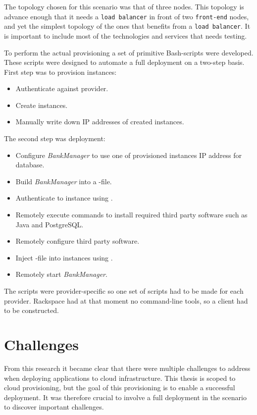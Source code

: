 The topology chosen for this scenario was that of three nodes.
This topology is advance enough that it needs a \texttt{load balancer} in front of two
\texttt{front-end} nodes, and yet the simplest topology of the ones that benefits from a \texttt{load balancer}.
It is important to include most of the technologies and services that needs testing.

To perform the actual provisioning a set of primitive Bash-scripts were developed.
These scripts were designed to automate a full deployment on a two-step basis.
First step was to provision instances:
\begin{itemize}
  \item Authenticate against provider.
  \item Create instances.
  \item Manually write down IP addresses of created instances.
\end{itemize}
The second step was deployment:
\begin{itemize}
  \item Configure \emph{BankManager} to use one of provisioned instances IP address for database.
  \item Build \emph{BankManager} into a -file.
  \item Authenticate to instance using .
  \item Remotely execute commands to install required third party software such as Java and PostgreSQL.
  \item Remotely configure third party software.
  \item Inject -file into instances using .
  \item Remotely start \emph{BankManager}.
\end{itemize}
The scripts were provider-specific so one set of scripts had to be made for each provider.
Rackspace had at that moment no command-line tools, so a  client had to be constructed.

\section{Challenges}

From this research it became clear that there were multiple challenges to address
when deploying applications to cloud infrastructure.
This thesis is scoped to cloud provisioning, but the goal of this provisioning is to 
enable a successful deployment. 
It was therefore crucial to involve a full deployment in the scenario to discover
important challenges.

